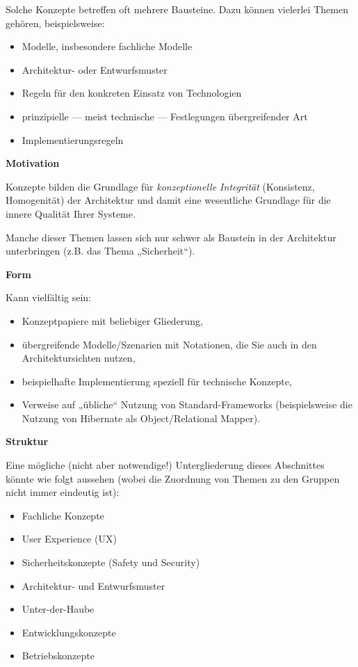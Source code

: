 \documentclass[
]{article}
\begin{document}
Solche Konzepte betreffen oft mehrere Bausteine. Dazu können vielerlei
Themen gehören, beispielsweise:

\begin{itemize}
\item
  Modelle, insbesondere fachliche Modelle
\item
  Architektur- oder Entwurfsmuster
\item
  Regeln für den konkreten Einsatz von Technologien
\item
  prinzipielle --- meist technische --- Festlegungen übergreifender Art
\item
  Implementierungsregeln
\end{itemize}

\textbf{Motivation}

Konzepte bilden die Grundlage für \emph{konzeptionelle Integrität}
(Konsistenz, Homogenität) der Architektur und damit eine wesentliche
Grundlage für die innere Qualität Ihrer Systeme.

Manche dieser Themen lassen sich nur schwer als Baustein in der
Architektur unterbringen (z.B. das Thema „Sicherheit``).

\textbf{Form}

Kann vielfältig sein:

\begin{itemize}
\item
  Konzeptpapiere mit beliebiger Gliederung,
\item
  übergreifende Modelle/Szenarien mit Notationen, die Sie auch in den
  Architektursichten nutzen,
\item
  beispielhafte Implementierung speziell für technische Konzepte,
\item
  Verweise auf „übliche`` Nutzung von Standard-Frameworks
  (beispielsweise die Nutzung von Hibernate als Object/Relational
  Mapper).
\end{itemize}

\textbf{Struktur}

Eine mögliche (nicht aber notwendige!) Untergliederung dieses
Abschnittes könnte wie folgt aussehen (wobei die Zuordnung von Themen zu
den Gruppen nicht immer eindeutig ist):

\begin{itemize}
\item
  Fachliche Konzepte
\item
  User Experience (UX)
\item
  Sicherheitskonzepte (Safety und Security)
\item
  Architektur- und Entwurfsmuster
\item
  Unter-der-Haube
\item
  Entwicklungskonzepte
\item
  Betriebskonzepte
\end{itemize}
\end{document}
